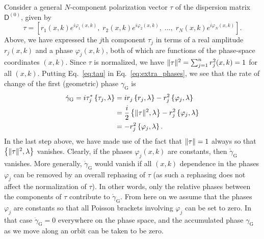 \begin{subappendices}
Consider a general $N$-component polarization vector $\tau$ of the dispersion matrix $\mathsf{D}^{(0)}$, given by
%
\begin{equation}
  \tau =
  \left[
    r_{1}(x, k) e^{i{\varphi}_{1}(x,k)},\;
    r_{2}(x, k) e^{i{\varphi}_{2}(x, k)},\;
    \ldots,\;
    r_{N}(x, k) e^{i{\varphi}_{N}(x, k)}
  \right].
  \label{eq:tau}
\end{equation}
%
Above, we have expressed the $j$th component $\tau_{j}$ in terms of a real amplitude $r_{j}(x, k)$ and a phase $\varphi_{j}(x, k)$, both of which are functions of the phase-space coordinates $(x,k)$.
Since $\tau$ is normalized, we have $\lVert\tau\rVert^{2} = \sum_{j=1}^{n} r_{j}^{2}(x, k) = 1$ for all $(x, k)$.
Putting Eq.~\eqref{eq:tau} in Eq.~\eqref{eq:extra_phases}, we see that the rate of change of the first (geometric) phase $\gamma_{\text{G}}$ is
%
\begin{equation}
  \begin{aligned}
    \dot{\gamma}_{\text{G}} = i\tau^{*}_{j}\left\{\tau_{j}, \lambda\right\}
                  &= ir_{j}\left\{r_{j}, \lambda\right\} - r_{j}^{2}\left\{\varphi_{j}, \lambda\right\}\\
                 &= \frac{i}{2}\left\{\lVert\tau\rVert^{2}, \lambda\right\} - r_{j}^{2}\left\{\varphi_{j}, \lambda\right\}\\
                 &= -r_{j}^{2}\left\{\varphi_{j}, \lambda\right\}.
  \end{aligned}
\end{equation}
%
In the last step above, we have made use of the fact that $\lVert\tau\rVert = 1$ always so that $\left\{\lVert\tau\rVert^{2}, \lambda\right\}$ vanishes.
Clearly, if the phases $\varphi_{j}(x, k)$ are constants, then $\dot{\gamma}_{\text{G}}$ vanishes.
More generally, $\dot{\gamma}_{\text{G}}$ would vanish if all $(x, k)$ dependence in the phases $\varphi_{j}$ can be removed by an overall rephasing of $\tau$ (as such a rephasing does not affect the normalization of $\tau$).
In other words, only the relative phases between the components of $\tau$ contribute to $\dot{\gamma}_{\text{G}}$.
From here on we assume that the phases $\varphi_{j}$ are constants so that all Poisson brackets involving $\varphi_{j}$ can be set to zero.
In that case $\dot{\gamma}_{\text{G}} = 0$ everywhere on the phase space, and the accumulated phase $\gamma_{\text{G}}$ as we move along an orbit can be taken to be zero.


\end{subappendices}
